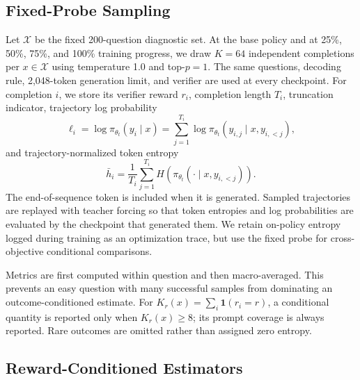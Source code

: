 \documentclass[letterpaper]{article}
\begin{document}
\subsection{Fixed-Probe Sampling}

Let \(\mathcal X\) be the fixed 200-question diagnostic set.  At the base
policy and at 25\%, 50\%, 75\%, and 100\% training progress, we draw
\(K=64\) independent completions per \(x\in\mathcal X\) using temperature
1.0 and top-\(p=1\).  The same questions, decoding rule, 2,048-token
generation limit, and verifier are used at every checkpoint.  For completion
\(i\), we store its verifier reward \(r_i\), completion length \(T_i\),
truncation indicator, trajectory log probability
\[
\ell_i=\log\pi_{\theta_t}(y_i\mid x)
      =\sum_{j=1}^{T_i}\log\pi_{\theta_t}
       (y_{i,j}\mid x,y_{i,<j}),
\]
and trajectory-normalized token entropy
\[
\bar h_i=\frac{1}{T_i}\sum_{j=1}^{T_i}
H\!\left(\pi_{\theta_t}(\cdot\mid x,y_{i,<j})\right).
\]
The end-of-sequence token is included when it is generated.  Sampled
trajectories are replayed with teacher forcing so that token entropies and log
probabilities are evaluated by the checkpoint that generated them.  We retain
on-policy entropy logged during training as an optimization trace, but use the
fixed probe for cross-objective conditional comparisons.

Metrics are first computed within question and then macro-averaged.  This
prevents an easy question with many successful samples from dominating an
outcome-conditioned estimate.  For
\(K_r(x)=\sum_i\mathbf 1(r_i=r)\), a conditional quantity is reported only
when \(K_r(x)\geq8\); its prompt coverage is always reported.  Rare outcomes
are omitted rather than assigned zero entropy.

\subsection{Reward-Conditioned Estimators}
\end{document}
